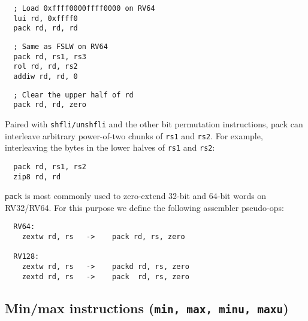 \begin{minipage}{\linewidth}
\begin{verbatim}
  ; Load 0xffff0000ffff0000 on RV64
  lui rd, 0xffff0
  pack rd, rd, rd
\end{verbatim}
\end{minipage}

\begin{minipage}{\linewidth}
\begin{verbatim}
  ; Same as FSLW on RV64
  pack rd, rs1, rs3
  rol rd, rd, rs2
  addiw rd, rd, 0
\end{verbatim}
\end{minipage}

\begin{minipage}{\linewidth}
\begin{verbatim}
  ; Clear the upper half of rd
  pack rd, rd, zero
\end{verbatim}
\end{minipage}

Paired with {\tt shfli/unshfli} and the other bit permutation instructions,
pack can interleave arbitrary power-of-two chunks of {\tt rs1} and {\tt rs2}. For
example, interleaving the bytes in the lower halves of {\tt rs1} and {\tt rs2}:

\begin{minipage}{\linewidth}
\begin{verbatim}
  pack rd, rs1, rs2
  zip8 rd, rd
\end{verbatim}
\end{minipage}

{\tt pack} is most commonly used to zero-extend 32-bit and 64-bit words on
RV32/RV64. For this purpose we define the following assembler pseudo-ops:

\begin{minipage}{\linewidth}
\begin{verbatim}
  RV64:
    zextw rd, rs   ->    pack rd, rs, zero

  RV128:
    zextw rd, rs   ->    packd rd, rs, zero
    zextd rd, rs   ->    pack  rd, rs, zero
\end{verbatim}
\end{minipage}


\subsection{Min/max instructions (\texttt{min, max, minu, maxu})}

